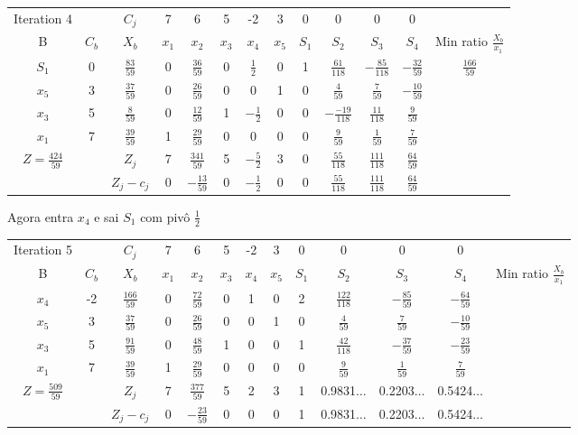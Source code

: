 \documentclass[11pt]{article}
\begin{document}
\begin{center}
\begin{tabular}{c c c c c c c c c c c c c}
Iteration 4 &  & \(C_j\) & 7 & 6 & 5 & -2 & 3 & 0 & 0 & 0 & 0 & \\
B & \(C_b\) & \(X_b\) & \(x_1\) & \(x_2\) & \(x_3\) & \(x_4\) & \(x_5\) & \(S_1\) & \(S_2\) & \(S_3\) & \(S_4\) & Min ratio \(\frac{X_b}{x_1}\)\\
\(S_1\) & 0 & \(\frac{83}{59}\) & 0 & \(\frac{36}{59}\) & 0 & \(\frac{1}{2}\) & 0 & 1 & \(\frac{61}{118}\) & \(-\frac{85}{118}\) & \(-\frac{32}{59}\) & \(\frac{166}{59}\)\\
\(x_5\) & 3 & \(\frac{37}{59}\) & 0 & \(\frac{26}{59}\) & 0 & 0 & 1 & 0 & \(\frac{4}{59}\) & \(\frac{7}{59}\) & \(-\frac{10}{59}\) & \\
\(x_3\) & 5 & \(\frac{8}{59}\) & 0 & \(\frac{12}{59}\) & 1 & \(-\frac{1}{2}\) & 0 & 0 & \(-\frac{-19}{118}\) & \(\frac{11}{118}\) & \(\frac{9}{59}\) & \\
\(x_1\) & 7 & \(\frac{39}{59}\) & 1 & \(\frac{29}{59}\) & 0 & 0 & 0 & 0 & \(\frac{9}{59}\) & \(\frac{1}{59}\) & \(\frac{7}{59}\) & \\
\(Z=\frac{424}{59}\) &  & \(Z_j\) & 7 & \(\frac{341}{59}\) & 5 & \(-\frac{5}{2}\) & 3 & 0 & \(\frac{55}{118}\) & \(\frac{111}{118}\) & \(\frac{64}{59}\) & \\
 &  & \(Z_j-c_j\) & 0 & \(-\frac{13}{59}\) & 0 & \(-\frac{1}{2}\) & 0 & 0 & \(\frac{55}{118}\) & \(\frac{111}{118}\) & \(\frac{64}{59}\) & \\
\end{tabular}
\end{center}

Agora entra \(x_4\) e sai \(S_1\) com pivô \(\frac{1}{2}\)
\begin{center}
\begin{tabular}{c c c c c c c c c c c c c}
Iteration 5 &  & \(C_j\) & 7 & 6 & 5 & -2 & 3 & 0 & 0 & 0 & 0 & \\
B & \(C_b\) & \(X_b\) & \(x_1\) & \(x_2\) & \(x_3\) & \(x_4\) & \(x_5\) & \(S_1\) & \(S_2\) & \(S_3\) & \(S_4\) & Min ratio \(\frac{X_b}{x_1}\)\\
\(x_4\) & -2 & \(\frac{166}{59}\) & 0 & \(\frac{72}{59}\) & 0 & 1 & 0 & 2 & \(\frac{122}{118}\) & \(-\frac{85}{59}\) & \(-\frac{64}{59}\) & \\
\(x_5\) & 3 & \(\frac{37}{59}\) & 0 & \(\frac{26}{59}\) & 0 & 0 & 1 & 0 & \(\frac{4}{59}\) & \(\frac{7}{59}\) & \(-\frac{10}{59}\) & \\
\(x_3\) & 5 & \(\frac{91}{59}\) & 0 & \(\frac{48}{59}\) & 1 & 0 & 0 & 1 & \(\frac{42}{118}\) & \(-\frac{37}{59}\) & \(-\frac{23}{59}\) & \\
\(x_1\) & 7 & \(\frac{39}{59}\) & 1 & \(\frac{29}{59}\) & 0 & 0 & 0 & 0 & \(\frac{9}{59}\) & \(\frac{1}{59}\) & \(\frac{7}{59}\) & \\
\(Z=\frac{509}{59}\) &  & \(Z_j\) & 7 & \(\frac{377}{59}\) & 5 & 2 & 3 & 1 & 0.9831\(\dots\) & 0.2203\(\dots\) & 0.5424\(\dots\) & \\
 &  & \(Z_j-c_j\) & 0 & \(-\frac{23}{59}\) & 0 & 0 & 0 & 1 & 0.9831\(\dots\) & 0.2203\(\dots\) & 0.5424\(\dots\) & \\
\end{tabular}
\end{center}
\end{document}
